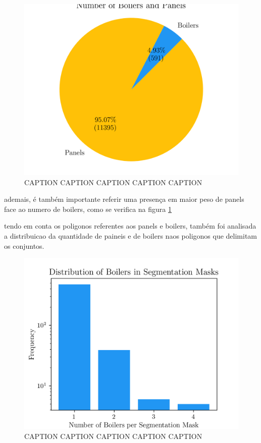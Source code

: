 \documentclass[conference]{IEEEtran}
\begin{document}
\begin{figure}[H]
    \centering
    \includegraphics[width=1\linewidth]{assets/data_distribution.png}
    \caption{CAPTION CAPTION CAPTION CAPTION CAPTION}
    \label{fig:data_distribution}
\end{figure}

ademais, é também importante referir uma presença em maior peso de panels face ao numero de boilers, como se verifica na figura \ref{fig:data_distribution}

tendo em conta os poligonos referentes aos panels e boilers, também foi analisada a distribuicao da quantidade de paineis e de boilers naos poligonos que delimitam os conjuntos.

\begin{figure}[H]
    \centering
    \includegraphics[width=1\linewidth]{assets/data_boil_distribution.png}
    \caption{CAPTION CAPTION CAPTION CAPTION CAPTION}
    \label{fig:data_boil_distribution}
\end{figure}
\end{document}
